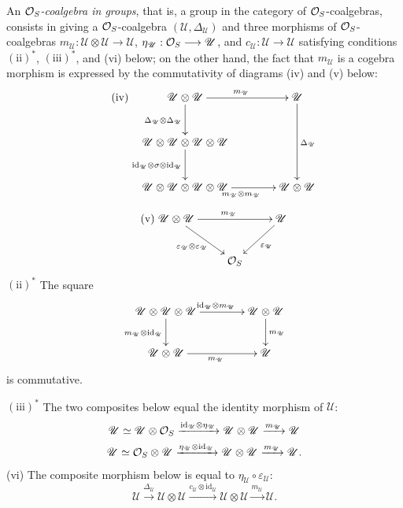 An \emph{$\mathcal{O}_S$-coalgebra in groups}, that is, a group in the category of $\mathcal{O}_S$-coalgebras, consists in giving a $\mathcal{O}_S$-coalgebra $(\mathscr U,\Delta_{\mathscr U})$ and three morphisms of $\mathcal{O}_S$-coalgebras $m_{\mathscr U}:\mathscr U\otimes\mathscr U\to\mathscr U$, $\eta_{\mathscr U}:\mathcal{O}_S\longrightarrow\mathscr U$, and $c_{\mathscr U}:\mathscr U\to\mathscr U$ satisfying conditions $(\mathrm{ii})^*$, $(\mathrm{iii})^*$, and (vi) below; on the other hand, the fact that $m_{\mathscr U}$ is a cogebra morphism is expressed by the commutativity of diagrams (iv) and (v) below:
\begin{equation}\tag{iv}
\xymatrix@C=4em@R=2.7em{\mathscr U\otimes\mathscr U\ar[r]^{m_{\mathscr U}}\ar[d]_{\Delta_{\mathscr U}\otimes\Delta_{\mathscr U}}&\mathscr U\ar[dd]^{\Delta_{\mathscr U}}\\
\mathscr U\otimes\mathscr U\otimes\mathscr U\otimes\mathscr U\ar[d]_{\mathrm{id}_{\mathscr U}\otimes\sigma\otimes\mathrm{id}_{\mathscr U}}&\\
\mathscr U\otimes\mathscr U\otimes\mathscr U\otimes\mathscr U\ar[r]_{m_{\mathscr U}\otimes m_{\mathscr U}}&\mathscr U\otimes\mathscr U}
\end{equation}
\begin{equation}\tag{v}
\xymatrix{\mathscr U\otimes\mathscr U\ar[rr]^{m_{\mathscr U}}\ar[dr]_{\varepsilon_{\mathscr U}\otimes\varepsilon_{\mathscr U}}&&\mathscr U\ar[dl]^{\varepsilon_{\mathscr U}}\\&\OS&}
\end{equation}
\noindent $(\mathrm{ii})^*$ The square
\[
\xymatrix@C=4em{\mathscr U\otimes\mathscr U\otimes\mathscr U\ar[r]^{\mathrm{id}_{\mathscr U}\otimes m_{\mathscr U}}\ar[d]_{m_{\mathscr U}\otimes\mathrm{id}_{\mathscr U}}&\mathscr U\otimes\mathscr U\ar[d]^{m_{\mathscr U}}\\
\mathscr U\otimes\mathscr U\ar[r]_{m_{\mathscr U}}&\mathscr U}
\]
is commutative.

\noindent $(\mathrm{iii})^*$ The two composites below equal the identity morphism of $\mathscr U$:
\[
\begin{gathered}
\mathscr U\simeq\mathscr U\otimes\mathcal{O}_S\xrightarrow{\mathrm{id}_{\mathscr U}\otimes\eta_{\mathscr U}}\mathscr U\otimes\mathscr U\xrightarrow{m_{\mathscr U}}\mathscr U\\
\mathscr U\simeq\mathcal{O}_S\otimes\mathscr U\xrightarrow{\eta_{\mathscr U}\otimes\mathrm{id}_{\mathscr U}}\mathscr U\otimes\mathscr U\xrightarrow{m_{\mathscr U}}\mathscr U.
\end{gathered}
\]
\noindent (vi) The composite morphism below is equal to $\eta_{\mathscr U}\circ\varepsilon_{\mathscr U}$:
\[
\mathscr U\xrightarrow{\Delta_{\mathscr U}}\mathscr U\otimes\mathscr U\xrightarrow{c_{\mathscr U}\otimes\mathrm{id}_{\mathscr U}}\mathscr U\otimes\mathscr U\xrightarrow{m_{\mathscr U}}\mathscr U.
\]

